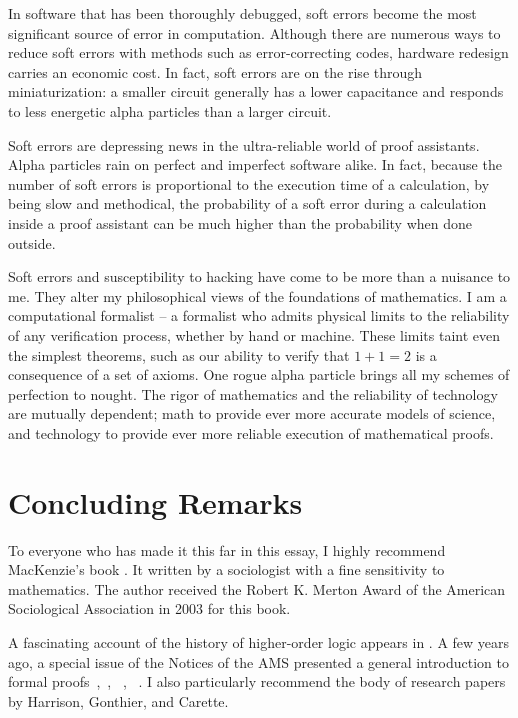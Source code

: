 \documentclass{llncs}
\begin{document}

In software that has been thoroughly debugged, soft errors become the
most significant source of error in computation.  Although there are
numerous ways to reduce soft errors with methods such as error-correcting
codes, hardware redesign carries an economic cost.  In fact, soft errors are on
the rise through miniaturization: a smaller circuit generally has a lower
capacitance and responds to less energetic alpha particles than a larger
circuit.

Soft errors are depressing news in the ultra-reliable world of proof
assistants.  Alpha particles rain on perfect and imperfect software
alike.  In fact, because the number of soft errors is proportional to
the execution time of a calculation, by being slow and methodical, the
probability of a soft error during a calculation inside a proof
assistant can be much higher than the probability when done outside.


Soft errors and susceptibility to hacking have come to be more than a
nuisance to me.  They alter my philosophical views of the foundations
of mathematics.  I am a computational formalist -- a formalist who
admits physical limits to the reliability of any verification process,
whether by hand or machine.  These limits taint even the simplest
theorems, such as our ability to verify that $1+1=2$ is a consequence
of a set of axioms.  One rogue alpha particle brings all my schemes of
perfection to nought.  The rigor of mathematics and the reliability of
technology are mutually dependent; math to provide ever more accurate
models of science, and technology to provide ever more reliable
execution of mathematical proofs.

\newpage
\section{Concluding Remarks}


To everyone who has made it this far in this essay, I highly recommend
MacKenzie's book \cite{Mac}.  It written by a sociologist with a fine
sensitivity to mathematics.  The author received the Robert K. Merton
Award of the American Sociological Association in 2003 for this book.

A fascinating account of the history of higher-order logic appears in
\cite{Gor}.  A few years ago, a special issue of the Notices of the
AMS presented a general introduction to formal
proofs~\cite{Hales:2008:formal},~\cite{Harrison:2008:formal},
~\cite{gonthier:2008:formal}, ~\cite{Wiedijk:2008:formal}.  I also
particularly recommend the body of research papers by Harrison,
Gonthier, and Carette.
\end{document}
